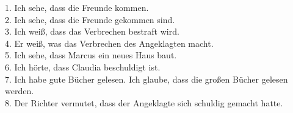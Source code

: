 \documentclass[a4paper]{article}
\begin{document}
1. Ich sehe, dass die Freunde kommen. \\
2. Ich sehe, dass die Freunde gekommen sind. \\
3. Ich weiß, dass das Verbrechen bestraft wird. \\
4. Er weiß, was das Verbrechen des Angeklagten macht. \\
5. Ich sehe, dass Marcus ein neues Haus baut. \\
6. Ich hörte, dass Claudia beschuldigt ist. \\
7. Ich habe gute Bücher gelesen. Ich glaube, dass die großen Bücher gelesen werden. \\
8. Der Richter vermutet, dass der Angeklagte sich schuldig gemacht hatte.
\end{document}
